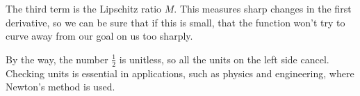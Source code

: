 \documentclass{article}
\begin{document}
The third term is the Lipschitz ratio $M$. This measures sharp changes
in the first derivative, so we can be sure that if this is small, that
the function won't try to curve away from our goal on us too sharply.

By the way, the number $\frac{1}{2}$ is unitless, so all the units on
the left side cancel. Checking units is essential in applications,
such as physics and engineering, where Newton's method is used.

\end{document}
